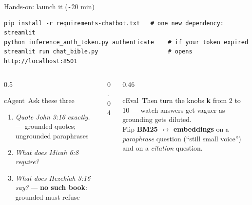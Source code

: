 \begin{frame}[fragile]{Hands-on: launch it (\textasciitilde20 min)}
  \begin{lstlisting}[style=shell]
pip install -r requirements-chatbot.txt   # one new dependency: streamlit
python inference_auth_token.py authenticate    # if your token expired
streamlit run chat_bible.py                    # opens http://localhost:8501
  \end{lstlisting}
  \vspace{4pt}
  \begin{columns}[t, totalwidth=\textwidth]
    \begin{column}{0.5\textwidth}
      \begin{featbox}{cAgent}{\faQuestionCircle\ Ask these three}
        \scriptsize
        \begin{enumerate}
          \item \emph{Quote John 3:16 exactly.} --- grounded quotes; ungrounded paraphrases
          \item \emph{What does Micah 6:8 require?}
          \item \emph{What does Hezekiah 3:16 say?} --- \textbf{no such book}: grounded must refuse
        \end{enumerate}
      \end{featbox}
    \end{column}
    \begin{column}{0.04\textwidth}\end{column}
    \begin{column}{0.46\textwidth}
      \begin{featbox}{cEval}{\faSlidersH\ Then turn the knobs}
        \scriptsize
        \textbf{k} from 2 to 10 --- watch answers get vaguer as grounding gets diluted.
        \\[3pt]Flip \textbf{BM25 $\leftrightarrow$ embeddings} on a \emph{paraphrase} question
        (``still small voice'') and on a \emph{citation} question.
      \end{featbox}
    \end{column}
  \end{columns}
\end{frame}

